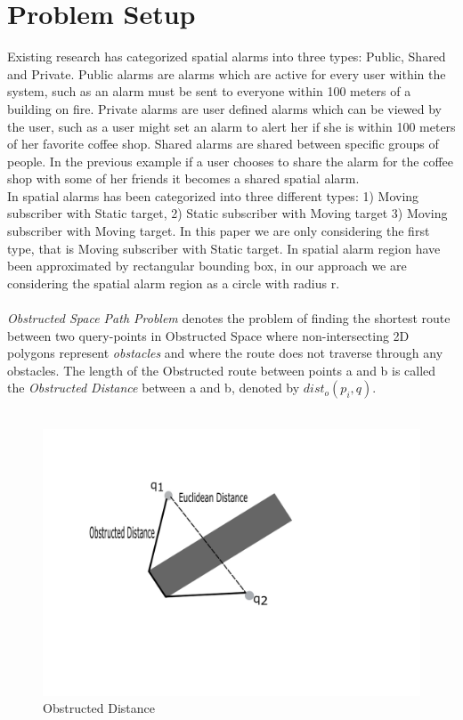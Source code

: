 \section{Problem Setup}
Existing research has categorized spatial alarms into three types: Public, Shared and Private. Public alarms are alarms which are active for every user within the system, such as an alarm must be sent to everyone within 100 meters of a building on fire. Private alarms are user defined alarms which can be viewed by the user, such as a user might set an alarm to alert her if she is within 100 meters of her favorite coffee shop. Shared alarms are shared between specific groups of people. In the previous example if a user chooses to share the alarm for the coffee shop with some of her friends it becomes a shared spatial alarm.\\
In \cite{bamba} spatial alarms has been categorized into three different types: 1) Moving subscriber with Static target, 2) Static subscriber with Moving target 3) Moving subscriber with Moving target. In this paper we are only considering the first type, that is Moving subscriber with Static target. 
In \cite{mur} spatial alarm region have been approximated by rectangular bounding box, in our approach we are considering the spatial alarm region as a circle with radius r.\\ \\
\textit{Obstructed Space Path Problem} \cite{ognn} denotes the problem of finding the shortest route between two query-points  in Obstructed Space where non-intersecting 2D polygons represent \textit{obstacles} and where the route does not traverse through any obstacles. The length of the Obstructed route between points a and b is called the \textit{Obstructed Distance} between a and b, denoted by $dist_o(p_i,q)$.\\ \\

\begin{figure}[h]
  \includegraphics[width=\linewidth]{obstructed_distance.png}
  \caption{Obstructed Distance}
  \label{fig:odist}
\end{figure}



